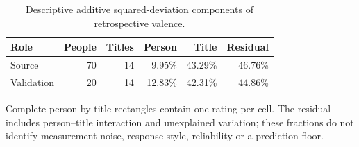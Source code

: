 \begin{table}[tbp]
\centering
\small
\caption{Descriptive additive squared-deviation components of retrospective valence.}
\label{tab:variation}
\begin{tabular}{lrrrrr}
\toprule
Role & People & Titles & Person & Title & Residual \\
\midrule
Source & 70 & 14 & 9.95\% & 43.29\% & 46.76\% \\
Validation & 20 & 14 & 12.83\% & 42.31\% & 44.86\% \\
\bottomrule
\end{tabular}
\par\medskip\begin{minipage}{0.97\linewidth}\footnotesize Complete person-by-title rectangles contain one rating per cell. The residual includes person--title interaction and unexplained variation; these fractions do not identify measurement noise, response style, reliability or a prediction floor.\end{minipage}
\end{table}
